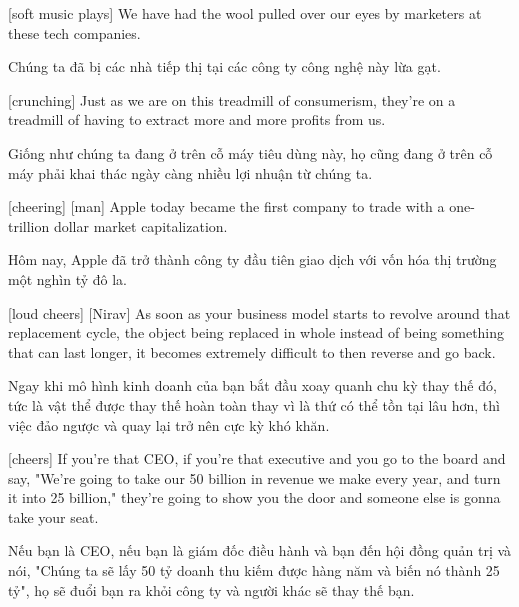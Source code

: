 \documentclass[a4paper]{article}
\begin{document}
	[soft music plays]
	We have had the wool pulled over our eyes by marketers at these tech companies.
	
	\begin{vietnamese-v2}
		Chúng ta đã bị các nhà tiếp thị tại các công ty công nghệ này lừa gạt.
	\end{vietnamese-v2}
	
	[crunching]
	Just as we are on this treadmill of consumerism, they're on a treadmill of having to extract more and more profits from us.
	
	\begin{vietnamese-v2}
		Giống như chúng ta đang ở trên cỗ máy tiêu dùng này, họ cũng đang ở trên cỗ máy phải khai thác ngày càng nhiều lợi nhuận từ chúng ta.
	\end{vietnamese-v2}
	
	[cheering]
	[man] Apple today became the first company to trade with a one-trillion dollar market capitalization.
	
	\begin{vietnamese-v2}
		 Hôm nay, Apple đã trở thành công ty đầu tiên giao dịch với vốn hóa thị trường một nghìn tỷ đô la.
	\end{vietnamese-v2}
	
	
	[loud cheers]
	[Nirav] As soon as your business model starts to revolve around that replacement cycle, the object being replaced in whole instead of being something that can last longer, it becomes extremely difficult to then reverse and go back.
	
	\begin{vietnamese-v2}
		 Ngay khi mô hình kinh doanh của bạn bắt đầu xoay quanh chu kỳ thay thế đó, tức là vật thể được thay thế hoàn toàn thay vì là thứ có thể tồn tại lâu hơn, thì việc đảo ngược và quay lại trở nên cực kỳ khó khăn.
	\end{vietnamese-v2}
	
	
	[cheers]
	If you're that CEO, if you're that executive and you go to the board and say, "We're going to take our 50 billion in revenue we make every year, and turn it into 25 billion," they're going to show you the door and someone else is gonna take your seat.
	
	
	\begin{vietnamese-v2}
		[hoan hô]
		Nếu bạn là CEO, nếu bạn là giám đốc điều hành và bạn đến hội đồng quản trị và nói, "Chúng ta sẽ lấy 50 tỷ doanh thu kiếm được hàng năm và biến nó thành 25 tỷ", họ sẽ đuổi bạn ra khỏi công ty và người khác sẽ thay thế bạn.
	\end{vietnamese-v2}
	
\end{document}
